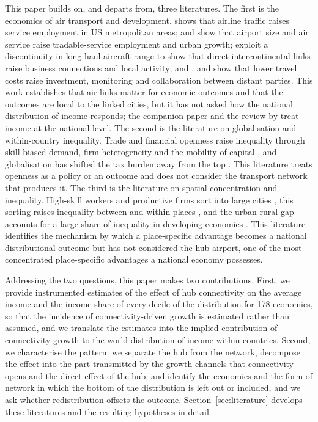 This paper builds on, and departs from, three literatures. The first is the economics of air transport and development. \citet{Brueckner_2003} shows that airline traffic raises service employment in US metropolitan areas; \citet{Sheard_2014} and \citet{Blonigen_2015} show that airport size and air service raise tradable-service employment and urban growth; \citet{Campante_2018} exploit a discontinuity in long-haul aircraft range to show that direct intercontinental links raise business connections and local activity; and \citet{Giroud_2013}, \citet{Bernstein_2016} and \citet{Catalini_2020} show that lower travel costs raise investment, monitoring and collaboration between distant parties. This work establishes that air links matter for economic outcomes and that the outcomes are local to the linked cities, but it has not asked how the national distribution of income responds; the companion paper \citep{Yue_2026} and the review by \citet{Lenaerts_2021} treat income at the national level. The second is the literature on globalisation and within-country inequality. Trade and financial openness raise inequality through skill-biased demand, firm heterogeneity and the mobility of capital \citep{Feenstra_1997,Jaumotte_2013,Helpman_2017,Furceri_2019,Lang_2023}, and globalisation has shifted the tax burden away from the top \citep{Egger_2019}. This literature treats openness as a policy or an outcome and does not consider the transport network that produces it. The third is the literature on spatial concentration and inequality. High-skill workers and productive firms sort into large cities \citep{Diamond_2016,Gaubert_2018}, this sorting raises inequality between and within places \citep{Moretti_2013,BaumSnow_2018,Fajgelbaum_2020}, and the urban-rural gap accounts for a large share of inequality in developing economies \citep{Young_2013}. This literature identifies the mechanism by which a place-specific advantage becomes a national distributional outcome but has not considered the hub airport, one of the most concentrated place-specific advantages a national economy possesses.

Addressing the two questions, this paper makes two contributions. First, we provide instrumented estimates of the effect of hub connectivity on the average income and the income share of every decile of the distribution for 178 economies, so that the incidence of connectivity-driven growth is estimated rather than assumed, and we translate the estimates into the implied contribution of connectivity growth to the world distribution of income within countries. Second, we characterise the pattern: we separate the hub from the network, decompose the effect into the part transmitted by the growth channels that connectivity opens and the direct effect of the hub, and identify the economies and the form of network in which the bottom of the distribution is left out or included, and we ask whether redistribution offsets the outcome. Section~\ref{sec:literature} develops these literatures and the resulting hypotheses in detail.

